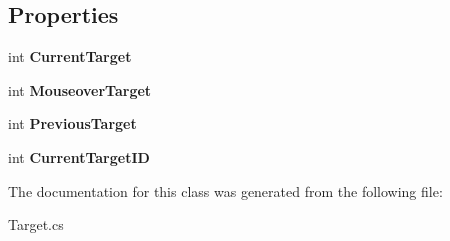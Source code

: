 \subsection*{Properties}
\begin{DoxyCompactItemize}
\item 
\hypertarget{classffxivlib_1_1_target_a7dc71e5dcda40dd3d2e1187c0322e832}{int {\bfseries Current\-Target}}\label{classffxivlib_1_1_target_a7dc71e5dcda40dd3d2e1187c0322e832}

\item 
\hypertarget{classffxivlib_1_1_target_ab7ca016a549a6d2621010523ea2f4b9f}{int {\bfseries Mouseover\-Target}}\label{classffxivlib_1_1_target_ab7ca016a549a6d2621010523ea2f4b9f}

\item 
\hypertarget{classffxivlib_1_1_target_afec2ed018ca78d593b3c40b1bfd03c42}{int {\bfseries Previous\-Target}}\label{classffxivlib_1_1_target_afec2ed018ca78d593b3c40b1bfd03c42}

\item 
\hypertarget{classffxivlib_1_1_target_a8af5ace3db90633c7961a381a24566cf}{int {\bfseries Current\-Target\-I\-D}}\label{classffxivlib_1_1_target_a8af5ace3db90633c7961a381a24566cf}

\end{DoxyCompactItemize}


The documentation for this class was generated from the following file\-:\begin{DoxyCompactItemize}
\item 
Target.\-cs\end{DoxyCompactItemize}
